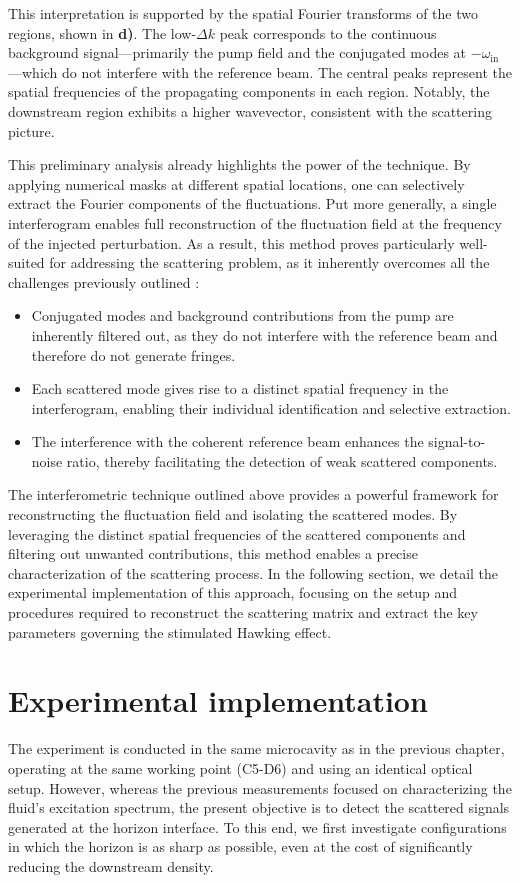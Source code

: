 This interpretation is supported by the spatial Fourier transforms of the two regions, shown in \textbf{d)}. The low-\(\Delta k\) peak corresponds to the continuous background signal—primarily the pump field and the conjugated modes at \(-\omega_{\text{in}}\)—which do not interfere with the reference beam. The central peaks represent the spatial frequencies of the propagating components in each region. Notably, the downstream region exhibits a higher wavevector, consistent with the scattering picture.

This preliminary analysis already highlights the power of the technique. By applying numerical masks at different spatial locations, one can selectively extract the Fourier components of the fluctuations. Put more generally, a single interferogram enables full reconstruction of the fluctuation field at the frequency of the injected perturbation. As a result, this method proves particularly well-suited for addressing the scattering problem, as it inherently overcomes all the challenges previously outlined :



\begin{itemize}
    \item Conjugated modes and background contributions from the pump are inherently filtered out, as they do not interfere with the reference beam and therefore do not generate fringes.
    \item Each scattered mode gives rise to a distinct spatial frequency in the interferogram, enabling their individual identification and selective extraction.
    \item The interference with the coherent reference beam enhances the signal-to-noise ratio, thereby facilitating the detection of weak scattered components.
\end{itemize}


The interferometric technique outlined above provides a powerful framework for reconstructing the fluctuation field and isolating the scattered modes.
 By leveraging the distinct spatial frequencies of the scattered components and filtering out unwanted contributions, this method enables a precise characterization of the scattering process. In the following section, we detail the experimental implementation of this approach, focusing on the setup and procedures required to reconstruct the scattering matrix and extract the key parameters governing the stimulated Hawking effect.

 \section{Experimental implementation}
 The experiment is conducted in the same microcavity as in the previous chapter, operating at the same working point (C5-D6) and using an identical optical setup. 
 However, whereas the previous measurements focused on characterizing the fluid's excitation spectrum, the present objective is to detect the scattered signals generated at the horizon interface. 
 To this end, we first investigate configurations in which the horizon is as sharp as possible, even at the cost of significantly reducing the downstream density. 
\label{sec:exp_implementation_scat_matrix}
